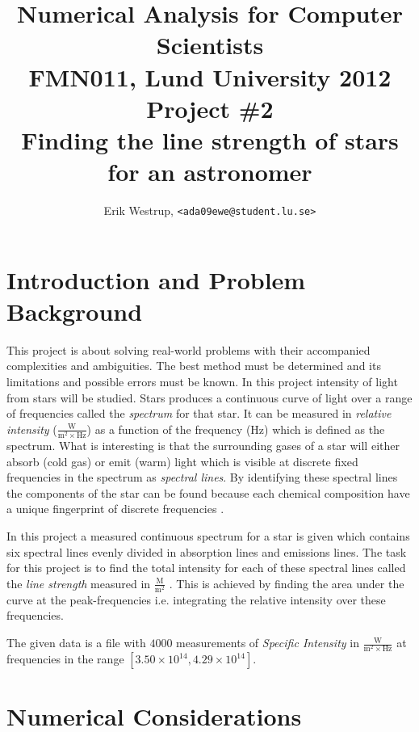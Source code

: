 \documentclass[10pt, a4paper]{article}
\title{Numerical Analysis for Computer Scientists\\ FMN011, Lund University 2012\\ Project \#2\\ Finding the line strength of stars for an astronomer}
\date{}
\author{Erik Westrup, \texttt{<ada09ewe@student.lu.se>}}
\begin{document}
\begin{titlepage}
\maketitle

\thispagestyle{empty}
\end{titlepage}
\setcounter{page}{2}

\section{Introduction and Problem Background}
This project is about solving real-world problems with their accompanied complexities and ambiguities. The best method must be determined and its limitations and possible errors must be known. In this project intensity of light from stars will be studied. Stars produces a continuous curve of light over a range of frequencies called the \emph{spectrum} for that star. It can be measured in \emph{relative intensity} ($\frac{\mathrm{W}}{\mathrm{m}^2\times\mathrm{Hz}}$) as a function of the frequency (Hz) which is defined as the spectrum. What is interesting is that the surrounding gases of a star will either absorb (cold gas) or emit (warm) light which is visible at discrete fixed frequencies in the spectrum as \emph{spectral lines}. By identifying these spectral lines the components of the star can be found  because each chemical composition have a unique fingerprint of discrete frequencies \cite{astronotes1} \cite{astronotes2}. %

In this project a measured continuous spectrum for a star is given which contains six spectral lines evenly divided in absorption lines and emissions lines. The task for this project is to find the total intensity for each of these spectral lines called the \emph{line strength} measured in $\frac{\mathrm{M}}{\mathrm{m}^2}$ \cite{linestrength}. This is achieved by finding the area under the curve at the peak-frequencies i.e. integrating the relative intensity over these frequencies. %

The given data is a file with $4000$ measurements of \emph{Specific Intensity} in $\frac{\mathrm{W}}{\mathrm{m}^2\times \mathrm{Hz}}$ at frequencies in the range $[3.50\times10^{14}, 4.29\times10^{14}]$.

\section{Numerical Considerations}
\end{document}
